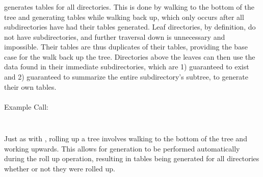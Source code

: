 \subsubsection{\gufitreesummaryall}
\gufitreesummaryall generates \treesummary tables for all
directories. This is done by walking to the bottom of the tree and
generating \treesummary tables while walking back up, which only
occurs after all subdirectories have had their \treesummary tables
generated. Leaf directories, by definition, do not have
subdirectories, and further traversal down is unnecessary and
impossible. Their \treesummary tables are thus duplicates of their
\summary tables, providing the base case for the walk back up the
tree. Directories above the leaves can then use the \treesummary data
found in their immediate subdirectories, which are 1) guaranteed to
exist and 2) guaranteed to summarize the entire subdirectory's
subtree, to generate their own \treesummary tables.
\\\\
Example Call:
\\\\
\indent \gufitreesummaryall \indexroot

\subsubsection{\gufirollup}
Just as with \gufitreesummaryall, rolling up a tree involves walking
to the bottom of the tree and working upwards. This allows for
\treesummary generation to be performed automatically during the roll
up operation, resulting in \treesummary tables being generated for all
directories whether or not they were rolled up.
